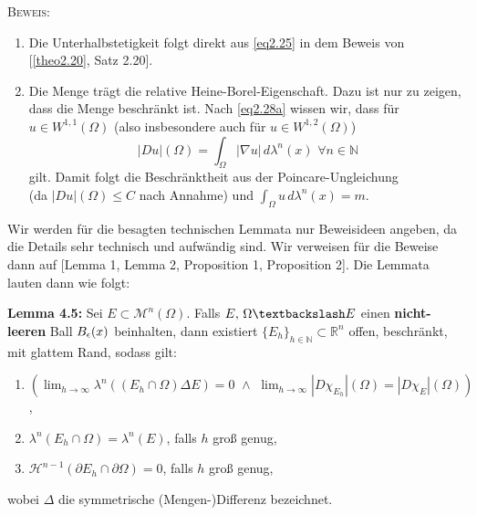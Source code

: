 \textsc{Beweis:} 
\begin{enumerate}
    \item Die Unterhalbstetigkeit folgt direkt aus \eqref{eq2.25} in dem Beweis von [\ref{theo2.20}, Satz 2.20].
    \item Die Menge trägt die relative Heine-Borel-Eigenschaft. Dazu ist nur zu zeigen, dass die Menge beschränkt ist. Nach \eqref{eq2.28a} wissen wir, dass für \(u \in W^{1,1}(\Omega)\) (also insbesondere auch für \(u \in W^{1,2}(\Omega)\))
    \begin{equation}
        |Du|(\Omega) = \int_{\Omega} |\nabla u| \, d\lambda^n(x) \, \, \forall n \in \mathbb{N}
    \end{equation}
    gilt. Damit folgt die Beschränktheit aus der Poincare-Ungleichung \\(da \(|Du|(\Omega) \leq C\) nach Annahme) und \(\int_{\Omega} u \, d\lambda^n(x) = m\).\QEDB
\end{enumerate}

Wir werden für die besagten technischen Lemmata nur Beweisideen angeben, da die Details sehr technisch und aufwändig sind. Wir verweisen für die Beweise dann auf \cite{modica1987gradient}[Lemma 1, Lemma 2, Proposition 1, Proposition 2]. Die Lemmata lauten dann wie folgt:\\[0.5cm]
\colorbox{generalYellow}{\begin{minipage}{16cm}{\textcolor{black}{}{\label{lem4.5}}}
\textbf{Lemma 4.5:} Sei \(E \subset \mathcal{M}^n(\Omega)\). Falls \(E, \, \Omega \textbackslash E\) einen \textbf{nicht-leeren} Ball \(B_{\epsilon}(x)\) beinhalten, dann existiert \(\{E_h\}_{h \in \mathbb{N}} \subset \mathbb{R}^n\) offen, beschränkt, mit glattem Rand, sodass gilt:
\begin{enumerate}
    \item \((\lim_{h \to \infty} \lambda^n((E_h \cap \Omega) \Delta E) = 0 \, \, \land \, \, \lim_{h \to \infty} |D\chi_{E_h}|(\Omega) = |D\chi_E|(\Omega))\),
    \item \(\lambda^n(E_h \cap \Omega) = \lambda^n(E)\), falls \(h\) groß genug,
    \item \(\mathcal{H}^{n-1}(\partial E_h \cap \partial \Omega) = 0\), falls \(h\) groß genug,
\end{enumerate}
wobei \(\Delta\) die symmetrische (Mengen-)Differenz bezeichnet.
\end{minipage}}

